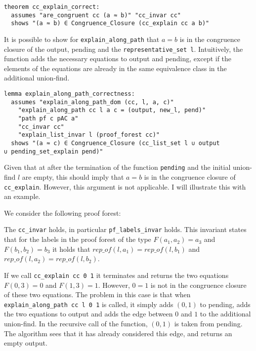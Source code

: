 \begin{lstlisting}
theorem cc_explain_correct:
  assumes "are_congruent cc (a ≈ b)" "cc_invar cc"
  shows "(a ≈ b) ∈ Congruence_Closure (cc_explain cc a b)"
\end{lstlisting}

It is possible to show for \lstinline{explain_along_path} that $a = b$ is in the congruence closure of the output, pending and the \lstinline{representative_set l}. Intuitively, the function adds the necessary equations to output and pending, except if the elements of the equations are already in the same equivalence class in the additional union-find.

\begin{lstlisting}
lemma explain_along_path_correctness:
  assumes "explain_along_path_dom (cc, l, a, c)"
    "explain_along_path cc l a c = (output, new_l, pend)"
    "path pf c pAC a"
    "cc_invar cc"
    "explain_list_invar l (proof_forest cc)"
  shows "(a ≈ c) ∈ Congruence_Closure (cc_list_set l ∪ output
∪ pending_set_explain pend)"
\end{lstlisting}

Given that at after the termination of the function \lstinline{pending} and the initial union-find $l$ are empty, this should imply that $a = b$ is in the congruence closure of \lstinline{cc_explain}.
However, this argument is not applicable. I will illustrate this with an example.

\begin{exmp}
We consider the following proof forest:

\begin{center}
\end{center}

The \lstinline{cc_invar} holds, in particular \lstinline{pf_labels_invar} holds. This invariant states that for the labels in the proof forest of the type $F(a_1, a_2) = a_3$ and $F(b_1, b_2) = b_3$ it holds that $rep\_of(l, a_1) = rep\_of(l, b_1)$ and $rep\_of(l, a_2) = rep\_of(l, b_2)$.

If we call \lstinline{cc_explain cc 0 1} it terminates and returns the two equations $F(0,3) = 0$ and $F(1,3) = 1$.
However, $0 = 1$ is not in the congruence closure of these two equations.
The problem in this case is that when \lstinline{explain_along_path cc l 0 1} is called, it simply adds $(0, 1)$ to pending, adds the two equations to output and adds the edge between $0$ and $1$ to the additional union-find.
In the recursive call of the function, $(0,1)$ is taken from pending.
The algorithm sees that it has already considered this edge, and returns an empty output.
\end{exmp}

